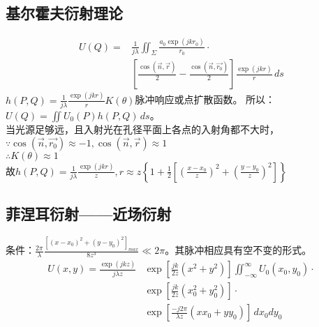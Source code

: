 \documentclass[twocolumn]{ctexart}
\begin{document}
\subsection{基尔霍夫衍射理论}
\begin{equation}
    \begin{aligned}
        U\left(Q\right)= & \frac{1}{j\lambda}\iint _{\Sigma} \frac{a_0\exp (jkr_0)}{r_0}\cdot                                                                        \\
                         & \left[\frac{\cos \left(\vec{n},\vec{r}\right)}{2}-\frac{\cos \left(\vec{n},\vec{r_0}\right)}{2}\right]\frac{\exp \left(jkr\right)}{r}\,ds
    \end{aligned}
    \nonumber
\end{equation}
$h\left(P,Q\right)=\frac{1}{j\lambda}\frac{\exp \left(jkr\right)}{r}K\left(\theta \right)$脉冲响应或点扩散函数。
所以：$U\left(Q\right)=\iint U_0(P)h\left(P,Q\right)\,ds$。\\
当光源足够远，且入射光在孔径平面上各点的入射角都不大时，
$\because \cos \left(\vec{n},\vec{r_0}\right)\approx -1,\cos \left(\vec{n},\vec{r}\right)\approx 1$\\
$\therefore K\left(\theta \right)\approx 1$\\
故$h\left(P,Q\right)=\frac{1}{j\lambda}\frac{\exp \left(jkr\right)}{z},r\approx z\left\{1+\frac{1}{2}\left[\left(\frac{x-x_0}{z}\right)^2+\left(\frac{y-y_0}{z}\right)^2\right]\right\}$

\subsection{菲涅耳衍射——近场衍射}
条件：$\frac{2\pi}{\lambda}\frac{\left[\left(x-x_0\right)^2+\left(y-y_0\right)^2\right]_{max}}{8z^3}\ll 2\pi$。其脉冲相应具有空不变的形式。
\begin{equation}
    \begin{aligned}
        U\left(x,y\right)=\frac{\exp \left(jkz\right)}{j\lambda z} & \exp \left[\frac{jk}{2z}\left(x^2+y^2\right)\right]\iint ^{\infty} _{-\infty}U_0\left(x_0,y_0\right)\cdot \\
                                                                   & \exp \left[\frac{jk}{2z}\left(x_0^2+y_0^2\right)\right]\cdot                                              \\
                                                                   & \exp \left[\frac{-j2\pi}{\lambda z}\left(xx_0+yy_0\right)\right]\,dx_0dy_0
    \end{aligned}
    \nonumber
\end{equation}
\end{document}
